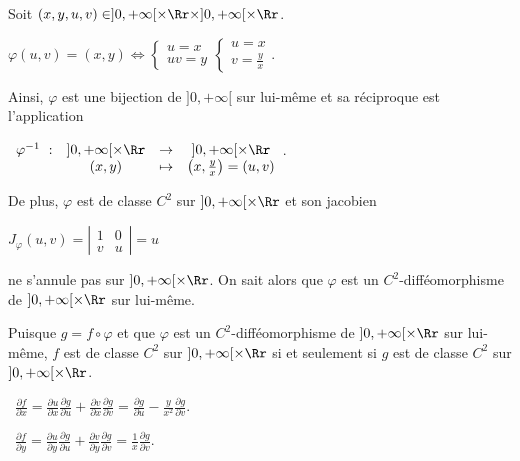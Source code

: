 {\begin{enumerate}
{Soit $(x,y,u,v)\in]0,+\infty[\times\Rr\times]0,+\infty[\times\Rr$.

\begin{center}
$\varphi(u,v)=(x,y)\Leftrightarrow\left\{
\begin{array}{l}
u=x\\
uv=y
\end{array}
\right.\left\{
\begin{array}{l}
u=x\\
v= \frac{y}{x}
\end{array}
\right.$.
\end{center}

Ainsi, $\varphi$ est une bijection de $]0,+\infty[$ sur lui-même et sa réciproque est l'application 

\begin{center}
$\begin{array}[t]{cccc}
\varphi^{-1}~:&]0,+\infty[\times\Rr&\rightarrow&]0,+\infty[\times\Rr\\
 &(x,y)&\mapsto&\left(x, \frac{y}{x}\right)=(u,v)
\end{array}
$.
\end{center}

De plus, $\varphi$ est de classe $C^2$ sur $]0,+\infty[\times\Rr$ et son jacobien

\begin{center}
$J_\varphi(u,v)=\left|
\begin{array}{cc}
1&0\\
v&u
\end{array}
\right|=u$
\end{center}

ne s'annule pas sur $]0,+\infty[\times\Rr$. On sait alors que $\varphi$ est un $C^2$-difféomorphisme de $]0,+\infty[\times\Rr$ sur lui-même.

Puisque $g=f\circ\varphi$ et que $\varphi$ est un $C^2$-difféomorphisme de $]0,+\infty[\times\Rr$ sur lui-même, $f$ est de classe $C^2$ sur $]0,+\infty[\times\Rr$ si et seulement si $g$ est de classe $C^2$ sur $]0,+\infty[\times\Rr$.

\textbullet~$ \frac{\partial f}{\partial x}= \frac{\partial u}{\partial x} \frac{\partial g}{\partial u}+ \frac{\partial v}{\partial x} \frac{\partial g}{\partial v}= \frac{\partial g}{\partial u}- \frac{y}{x^2} \frac{\partial g}{\partial v}$.

\textbullet~$ \frac{\partial f}{\partial y}= \frac{\partial u}{\partial y} \frac{\partial g}{\partial u}+ \frac{\partial v}{\partial y} \frac{\partial g}{\partial v}= \frac{1}{x} \frac{\partial g}{\partial v}$.

}
\end{enumerate}}
